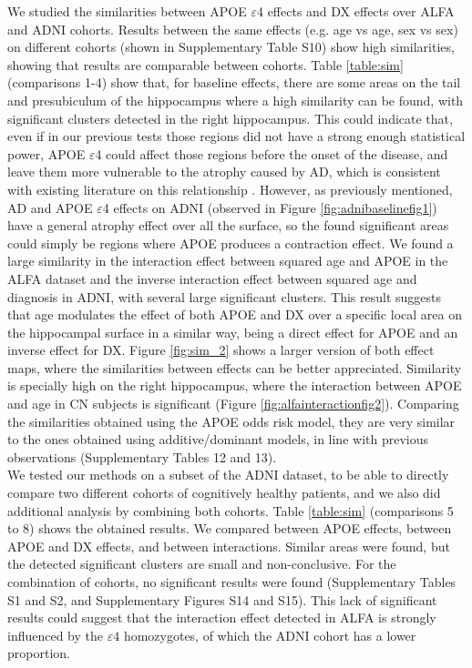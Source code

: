 We studied the similarities between APOE $\varepsilon$4 effects and DX effects over ALFA and ADNI cohorts. Results between the same effects (e.g. age vs age, sex vs sex) on different cohorts (shown in Supplementary Table S10) show high similarities, showing that results are comparable between cohorts. Table \ref{table:sim} (comparisons 1-4) show that, for baseline effects, there are some areas on the tail and presubiculum of the hippocampus where a high similarity can be found, with significant clusters detected in the right hippocampus. This could indicate that, even if in our previous tests those regions did not have a strong enough statistical power, APOE $\varepsilon$4 could affect those regions before the onset of the disease, and leave them more vulnerable to the atrophy caused by AD, which is consistent with existing literature on this relationship \cite{Wolk2010}. However, as previously mentioned, AD and APOE $\varepsilon$4 effects on ADNI (observed in Figure \ref{fig:adnibaselinefig1}) have a general atrophy effect over all the surface, so the found significant areas could simply be regions where APOE produces a contraction effect. We found a large similarity in the interaction effect between squared age and APOE in the ALFA dataset and the inverse interaction effect between squared age and diagnosis in ADNI, with several large significant clusters. This result suggests that age modulates the effect of both APOE and DX over a specific local area on the hippocampal surface in a similar way, being a direct effect for APOE and an inverse effect for DX. Figure \ref{fig:sim_2} shows a larger version of both effect maps, where the similarities between effects can be better appreciated. Similarity is specially high on the right hippocampus, where the interaction between APOE and age in CN subjects is significant (Figure \ref{fig:alfainteractionfig2}). Comparing the similarities obtained using the APOE odds risk model, they are very similar to the ones obtained using additive/dominant models, in line with previous observations (Supplementary Tables 12 and 13).  \\ 

We tested our methods on a subset of the ADNI dataset, to be able to directly compare two different cohorts of cognitively healthy patients, and we also did additional analysis by combining both cohorts. Table \ref{table:sim} (comparisons 5 to 8) shows the obtained results. We compared between APOE effects, between APOE and DX effects, and between interactions. Similar areas were found, but the detected significant clusters are small and non-conclusive. For the combination of cohorts, no significant results were found (Supplementary Tables S1 and S2, and Supplementary Figures S14 and S15). This lack of significant results could suggest that the interaction effect detected in ALFA is strongly influenced by the $\varepsilon4$ homozygotes, of which the ADNI cohort has a lower proportion. \\ 

